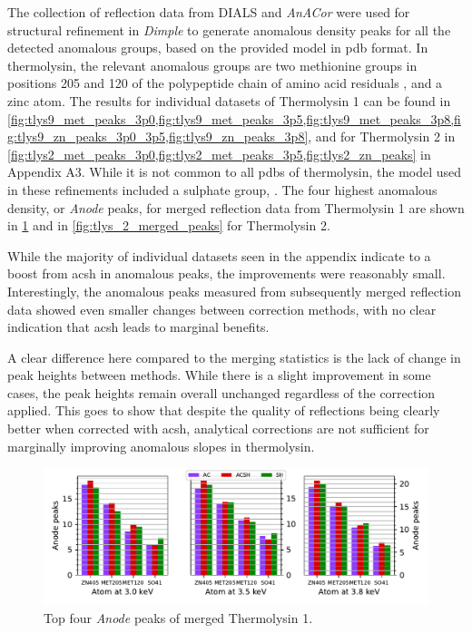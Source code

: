 The collection of reflection data from DIALS and \textit{AnACor} were used for structural refinement in \textit{Dimple} to generate anomalous density peaks for all the detected anomalous groups, based on the provided model in \ac{pdb} format. In thermolysin, the relevant anomalous groups are two methionine groups in positions 205 and 120 of the polypeptide chain of amino acid residuals %
, and a zinc atom. The results for individual datasets of Thermolysin 1 can be found in \cref{fig:tlys9_met_peaks_3p0,fig:tlys9_met_peaks_3p5,fig:tlys9_met_peaks_3p8,fig:tlys9_zn_peaks_3p0_3p5,fig:tlys9_zn_peaks_3p8}, and for Thermolysin 2 in \cref{fig:tlys2_met_peaks_3p0,fig:tlys2_met_peaks_3p5,fig:tlys2_zn_peaks} in Appendix A3. %
While it is not common to all \ac{pdb}s of thermolysin, the model used in these refinements included a sulphate group, . The four highest anomalous density, or \textit{Anode} peaks, for merged reflection data from Thermolysin 1 are shown in \cref{fig:tlys_9_merged_peaks} and in \cref{fig:tlys_2_merged_peaks} for Thermolysin 2.


While the majority of individual datasets seen in the appendix indicate to a boost from \ac{acsh} in anomalous peaks, the improvements were reasonably small. Interestingly, the anomalous peaks measured from subsequently merged reflection data showed even smaller changes between correction methods, with no clear indication that \ac{acsh} leads to marginal benefits.

A clear difference here compared to the merging statistics is the lack of change in peak heights between methods. While there is a slight improvement in some cases, the peak heights remain overall unchanged regardless of the correction applied. This goes to show that despite the quality of reflections being clearly better when corrected with \ac{acsh}, analytical corrections are not sufficient for marginally improving anomalous slopes in thermolysin.%

\begin{figure}[h]
    \centering
    \includegraphics[width = 1.1 \textwidth]{plots/exp1/tlys_9_P6122/peaks/merged_peaks_so4.pdf}
    \caption{Top four \textit{Anode} peaks of merged Thermolysin 1.}
    \label{fig:tlys_9_merged_peaks}
\end{figure}

